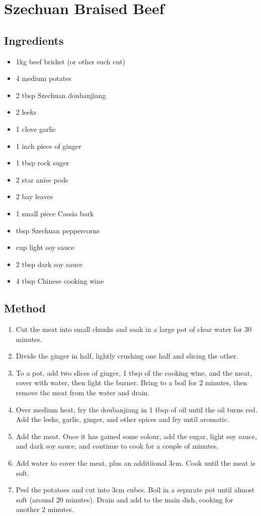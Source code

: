 \section{Szechuan Braised Beef}
\begin{multicols}{2}
  \subsection{Ingredients}
    \begin{itemize}
      \item 1kg beef brisket (or other such cut)
      \item 4 medium potates
      \item 2 tbsp Szechuan doubanjiang
      \item 2 leeks
      \item 1 clove garlic
      \item 1 inch piece of ginger
      \item 1 tbsp rock suger
      \item 2 star anise pods
      \item 2 bay leaves
      \item 1 small piece Cassia bark
      \item {} tbsp Szechuan peppercorns
      \item {} cup light soy sauce
      \item 2 tbsp dark soy sauce
      \item 4 tbsp Chinese cooking wine
    \end{itemize}
  \vfill\null
  \columnbreak
  \subsection{Method}
    \begin{enumerate}
      \item Cut the meat into small chunks and soak in a large pot of clear water for 30 minutes.
      \item Divide the ginger in half, lightly crushing one half and slicing the other.
      \item To a pot, add two slices of ginger, 1 tbsp of the cooking wine, and the meat, cover with water, then light the burner. Bring to a boil for 2 minutes, then remove the meat from the water and drain.
      \item Over medium heat, fry the doubanjiang in 1 tbsp of oil until the oil turns red. Add the leeks, garlic, ginger, and other spices and fry until aromatic.
      \item Add the meat. Once it has gained some colour, add the sugar, light soy sauce, and dark soy sauce, and continue to cook for a couple of minutes.
      \item Add water to cover the meat, plus an additiional 3cm. Cook until the meat is soft.
      \item Peel the potatoes and cut into 3cm cubes. Boil in a separate pot until almost soft (around 20 minutes). Drain and add to the main dish, cooking for another 2 minutes.
    \end{enumerate}
  \end{multicols}
